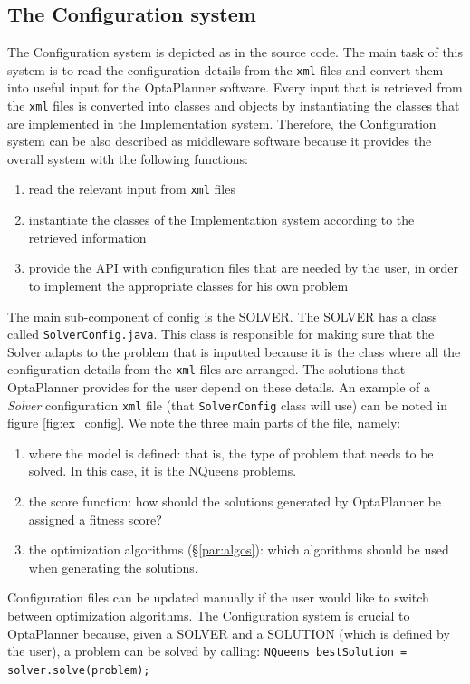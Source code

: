 \subsection{The Configuration system}
\label{subsec:config_sys}
The Configuration system is depicted as  in the source code. The main task of this system is to read the configuration details from the \verb!xml! files and convert them into useful input for the OptaPlanner software. Every input that is retrieved from the \verb!xml! files is converted into classes and objects by instantiating the classes that are implemented in the Implementation system. Therefore, the Configuration system can be also described as middleware software because it provides the overall system with the following functions:
\begin{enumerate}[label=(\roman*)]
    \item read the relevant input from \verb!xml! files 
    \item instantiate the classes of the Implementation system according to the retrieved information
    \item provide the API with configuration files that are needed by the user, in order to implement the appropriate classes for his own problem
\end{enumerate}
The main sub-component of config is the {\scriptsize SOLVER}. The {\scriptsize SOLVER} has a class called \verb!SolverConfig.java!. This class is responsible for making sure that the Solver adapts to the problem that is inputted because it is the class where all the configuration details from the \verb!xml! files are arranged. The solutions that OptaPlanner provides for the user depend on these details. An example of a \textit{Solver} configuration \verb!xml! file (that \verb!SolverConfig! class will use) can be noted in figure \ref{fig:ex_config}. We note the three main parts of the file, namely:
\begin{enumerate}[label=(\roman*)]
    \item where the model is defined: that is, the type of problem that needs to be solved. In this case, it is the NQueens problems.
    \item the score function: how should the solutions generated by OptaPlanner be assigned a fitness score?
    \item  the optimization algorithms (\S\ref{par:algos}): which algorithms should be used when generating the solutions.
\end{enumerate}
Configuration files can be updated manually if the user would like to switch between optimization algorithms. The Configuration system is crucial to OptaPlanner because, given a {\scriptsize SOLVER} and a {\scriptsize SOLUTION} (which is defined by the user), a problem can be solved by calling: \verb!NQueens bestSolution = solver.solve(problem);!\\\\
